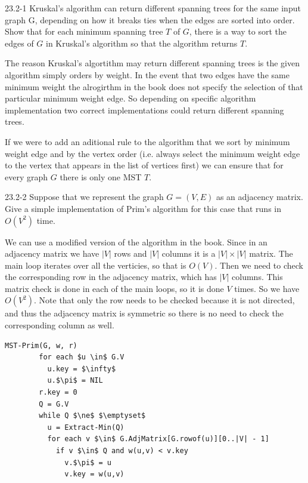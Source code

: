 \begin{problem}{23.2-1}
  Kruskal's algorithm can return different spanning trees for the same input graph G, depending on how it breaks ties
  when the edges are sorted into order. Show that for each minimum spanning tree $T$ of $G$, there is a way to sort the
  edges of $G$ in Kruskal's algorithm so that the algorithm returns $T$.
  \begin{solution}
    The reason Kruskal's algortithm may return different spanning trees is the given algorithm simply orders by weight.
    In the event that two edges have the same minimum weight the alrogirthm in the book does not specify the selection
    of that particular minimum weight edge.  So depending on specific algorithm implementation two correct
    implementations could return different spanning trees.

    If we were to add an aditional rule to the algorithm that we sort by minimum weight edge and by the vertex order
    (i.e. always select the minimum weight edge to the vertex that appears in the list of vertices first) we can ensure
    that for every graph $G$ there is only one MST $T$.
  \end{solution}
\end{problem}

\begin{problem}{23.2-2}
  Suppose that we represent the graph $G = (V,E)$ as an adjacency matrix. Give a simple implementation of Prim's
  algorithm for this case that runs in $O(V^2)$ time.
  \begin{solution}
    We can use a modified version of the algorithm in the book. Since in an adjacency matrix we have $|V|$ rows and $|V|$
    columns it is a $|V| \times |V|$ matrix. The main loop iterates over all the verticies, so that is $O(V)$. Then we need
    to check the corresponding row in the adjacency matrix, which has $|V|$ columns. This matrix check is done in each of
    the main loops, so it is done $V$ times. So we have $O(V^2)$. Note that only the row needs to be checked because it
    is not directed, and thus the adjacency matrix is symmetric so there is no need to check the corresponding column as
    well.
    \begin{lstlisting}[mathescape]
      MST-Prim(G, w, r)
        for each $u \in$ G.V
          u.key = $\infty$
          u.$\pi$ = NIL
        r.key = 0
        Q = G.V
        while Q $\ne$ $\emptyset$
          u = Extract-Min(Q)
          for each v $\in$ G.AdjMatrix[G.rowof(u)][0..|V| - 1]
            if v $\in$ Q and w(u,v) < v.key
              v.$\pi$ = u
              v.key = w(u,v)
    \end{lstlisting}
  \end{solution}
\end{problem}


